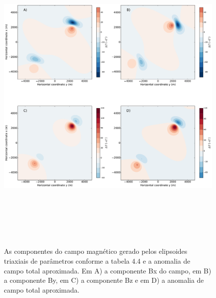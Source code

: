 \begin{figure}[hbt!]
	\centering \includegraphics[width=16cm,height=16cm]{figures/ellipsoid_triaxial_multi}
	\caption[As componentes do campo magnético gerado por dois corpos triaxiais e a anomalia de campo total aproximada.]{As componentes 
		do campo magnético gerado pelos elipsoides triaxiais de parâmetros conforme a tabela 4.4 e a anomalia de campo total aproximada. Em A) a componente Bx do campo, em B) a componente By, em C) a componente Bz e em D) a anomalia de campo total aproximada.}
	\label{fig:ellipsoid_triaxial_multi}
\end{figure}


